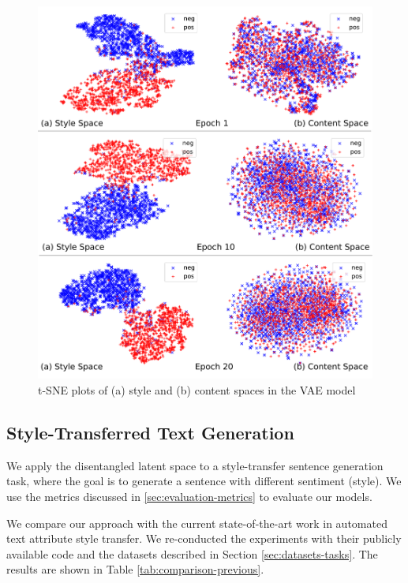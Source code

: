 \begin{figure}[ht]
	\includegraphics[width=\linewidth]{images/vae-latent-spaces}
	\caption{t-SNE plots of (a) style and (b) content spaces in the VAE model}
	\label{fig:vae-tsne}
\end{figure}

\subsection{Style-Transferred Text Generation}

We apply the disentangled latent space to a style-transfer sentence generation task, where the goal is to generate a sentence with different sentiment (style). We use the metrics discussed in \ref{sec:evaluation-metrics} to evaluate our models.

We compare our approach with the current state-of-the-art work in automated text attribute style transfer. We re-conducted the experiments with their publicly available code and the datasets described in Section \ref{sec:datasets-tasks}. The results are shown in Table \ref{tab:comparison-previous}.

